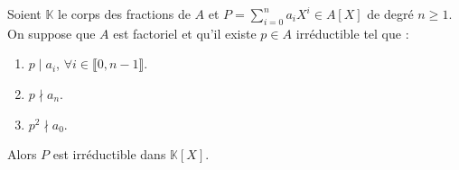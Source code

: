   \begin{theorem}
    \label{critere-d-eisenstein-6}
    Soient $\mathbb{K}$ le corps des fractions de $A$ et $P = \sum_{i=0}^n a_i X^i \in A[X]$ de degré $n \geq 1$. On suppose que $A$ est factoriel et qu'il existe $p \in A$ irréductible tel que :
    \begin{enumerate}[label={\bfseries(\roman*)}]
      \item \label{critere-d-eisenstein-7} $p \mid a_i$, $\forall i \in \llbracket 0, n-1 \rrbracket$.
      \item \label{critere-d-eisenstein-8} $p \nmid a_n$.
      \item \label{critere-d-eisenstein-9} $p^2 \nmid a_0$.
    \end{enumerate}
    Alors $P$ est irréductible dans $\mathbb{K}[X]$.
  \end{theorem}

